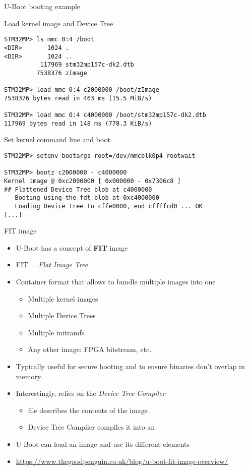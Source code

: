 \begin{frame}[fragile]{U-Boot booting example}
  \begin{block}{Load kernel image and Device Tree}
    {\tiny
\begin{verbatim}
STM32MP> ls mmc 0:4 /boot
<DIR>       1024 .
<DIR>       1024 ..
          117969 stm32mp157c-dk2.dtb
         7538376 zImage

STM32MP> load mmc 0:4 c2000000 /boot/zImage
7538376 bytes read in 463 ms (15.5 MiB/s)

STM32MP> load mmc 0:4 c4000000 /boot/stm32mp157c-dk2.dtb
117969 bytes read in 148 ms (778.3 KiB/s)
\end{verbatim}
    }
  \end{block}

  \begin{block}{Set kernel command line and boot}
    {\tiny
\begin{verbatim}
STM32MP> setenv bootargs root=/dev/mmcblk0p4 rootwait

STM32MP> bootz c2000000 - c4000000
Kernel image @ 0xc2000000 [ 0x000000 - 0x7306c8 ]
## Flattened Device Tree blob at c4000000
   Booting using the fdt blob at 0xc4000000
   Loading Device Tree to cffe0000, end cffffcd0 ... OK
[...]
\end{verbatim}
    }
  \end{block}
\end{frame}

\begin{frame}{FIT image}
  \begin{itemize}
  \item U-Boot has a concept of {\bf FIT} image
  \item FIT = {\em Flat Image Tree}
  \item Container format that allows to bundle multiple images into
    one
    \begin{itemize}
    \item Multiple kernel images
    \item Multiple Device Trees
    \item Multiple initramfs
    \item Any other image: FPGA bitstream, etc.
    \end{itemize}
  \item Typically useful for secure booting and to ensure binaries
	don't overlap in memory.
  \item Interestingly, relies on the {\em Device Tree Compiler}
    \begin{itemize}
    \item {} file describes the contents of the image
    \item Device Tree Compiler compiles it into an 
    \end{itemize}
  \item U-Boot can load an  image and use its different
    elements
  \item \url{https://www.thegoodpenguin.co.uk/blog/u-boot-fit-image-overview/}
  \end{itemize}
\end{frame}


